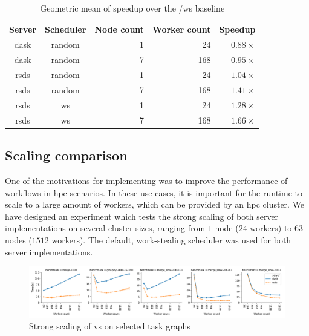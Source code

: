 \setlength{\tabcolsep}{5pt}
\begin{table}
	\caption[caption]{Geometric mean of speedup over the \dask{}/ws baseline}
	\centering
	\label{tab:rsds-geom-mean-speedup}
	\begin{tabular}{c|c|r|r|r}
		\textbf{Server} & \textbf{Scheduler} & \textbf{Node count} & \textbf{Worker	count} &
		\textbf{Speedup}                                                                                 \\
		\midrule
		dask            & random             & 1                   & 24                   & $0.88\times$ \\
		dask            & random             & 7                   & 168                  & $0.95\times$ \\
		rsds            & random             & 1                   & 24                   & $1.04\times$ \\
		rsds            & random             & 7                   & 168                  & $1.41\times$ \\
		rsds            & ws                 & 1                   & 24                   & $1.28\times$ \\
		rsds            & ws                 & 7                   & 168                  & $1.66\times$ \\
	\end{tabular}
\end{table}

\subsection*{Scaling comparison}
One of the motivations for implementing \rsds{} was to improve the performance
of \dask{} workflows in \gls{hpc} scenarios. In these
use-cases, it is important for the runtime to scale to a large amount of workers, which can be
provided by an \gls{hpc} cluster. We have designed an experiment which tests the
strong scaling of both server implementations on several cluster sizes, ranging from
$1$ node ($24$ workers) to $63$ nodes ($1512$ workers). The default, work-stealing scheduler was
used for both server implementations.

\begin{figure}[h]
	\centering
	\includegraphics[width=\textwidth]{./imgs/rsds/charts/rsds-dask-scaling}
	\caption{Strong scaling of \rsds{} vs \dask{} on selected task graphs}
	\label{fig:rsds-dask-scaling}
\end{figure}

